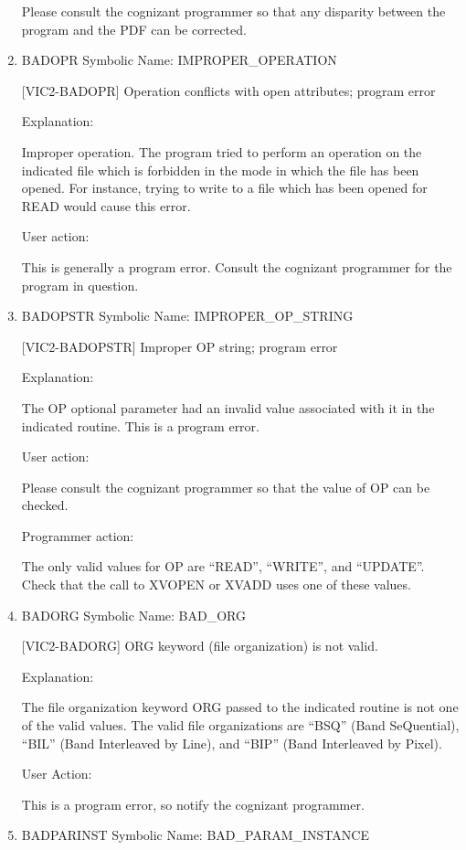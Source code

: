 \begin{enumerate}
Please consult the cognizant programmer so that any
disparity between the program and the PDF can be corrected.


\item BADOPR Symbolic Name: IMPROPER\_OPERATION

[VIC2-BADOPR] Operation conflicts with open attributes; program error

Explanation:

Improper operation.  The program tried to perform an operation
on the indicated file which is forbidden in the mode in which
the file has been opened.  For instance, trying to write to a
file which has been opened for READ would cause this error.

User action:

This is generally a program error.  Consult the cognizant
programmer for the program in question.


\item BADOPSTR Symbolic Name: IMPROPER\_OP\_STRING

[VIC2-BADOPSTR] Improper OP string; program error

Explanation:

The OP optional parameter had an invalid value associated with
it in the indicated routine.  This is a program error.

User action:

Please consult the cognizant programmer so that the value of
OP can be checked.

Programmer action:

The only valid values for OP are ``READ'', ``WRITE'', and
``UPDATE''.  Check that the call to XVOPEN or XVADD uses one
of these values.


\item BADORG Symbolic Name: BAD\_ORG

[VIC2-BADORG] ORG keyword (file organization) is not valid.

Explanation:

The file organization keyword ORG passed to the indicated
routine is not one of the valid values.  The valid file
organizations are ``BSQ'' (Band SeQuential), ``BIL'' (Band
Interleaved by Line), and ``BIP'' (Band Interleaved by Pixel).

User Action:

This is a program error, so notify the cognizant programmer.


\item BADPARINST Symbolic Name: BAD\_PARAM\_INSTANCE


\end{enumerate}
